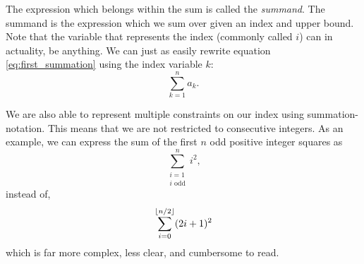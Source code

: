 \documentclass[prereq]{cslesson}
\numberwithin{equation}{section}
\begin{document}
The expression which belongs within the sum is called the \textit{summand}. The summand is the expression which we sum
over given an index and upper bound. Note that the variable that represents the index (commonly called $i$) can in actuality, be anything. We can just as easily rewrite equation \ref{eq:first_summation} using the index variable $k$:
\begin{equation}
    \sum^n_{k=1}a_k.
\end{equation}

We are also able to represent multiple constraints on our index using summation-notation. This means that we are not restricted
to consecutive integers. As an example, we can express the sum of the first $n$ odd positive integer squares as
\begin{equation}
    \sum^n_{\substack{i=1 \\ i\text{ odd}}}i^2,
\end{equation}
instead of,
\begin{equation*}
    \sum^{\floor*{n/2}}_{i=0}(2i+1)^2
\end{equation*}
which is far more complex, less clear, and cumbersome to read. 
\end{document}
